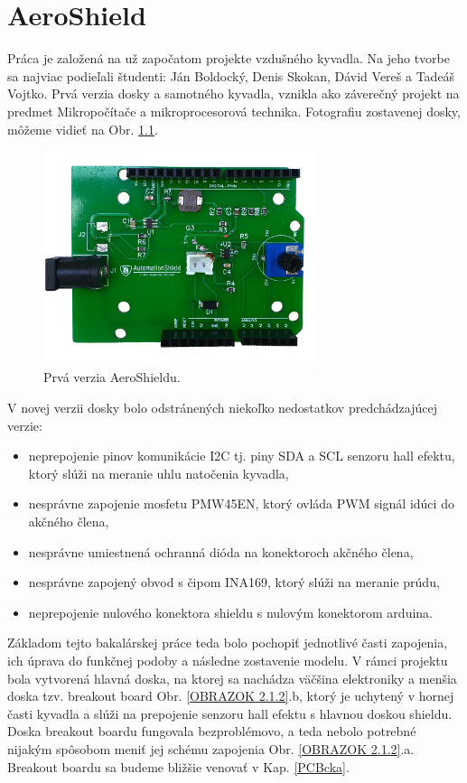 \chapter{AeroShield}

Práca je založená na už započatom projekte vzdušného kyvadla. Na jeho tvorbe sa najviac podieľali študenti: Ján Boldocký, Denis Skokan, Dávid Vereš a Tadeáš Vojtko. Prvá verzia dosky a samotného kyvadla, vznikla ako záverečný projekt na predmet Mikropočítače a mikroprocesorová technika. Fotografiu zostavenej dosky, môžeme vidieť na Obr. \ref{OBRAZOK 2.1.1}.


\begin{figure}[tbh]
	\centering
	\includegraphics[width=80mm]{obr/oldshield.png}
	\caption{Prvá verzia AeroShieldu.}\label{OBRAZOK 2.1.1}
\end{figure}


V novej verzii dosky bolo odstránených niekoľko nedostatkov predchádzajúcej verzie:

\begin{itemize}
	\item neprepojenie pinov komunikácie I2C tj. piny SDA a SCL senzoru hall efektu, ktorý slúži na meranie uhlu natočenia kyvadla,
	\item nesprávne zapojenie mosfetu PMW45EN, ktorý ovláda PWM signál idúci do akčného člena,
	\item nesprávne umiestnená ochranná dióda na konektoroch akčného člena,
	\item nesprávne zapojený obvod s čipom INA169, ktorý slúži na meranie prúdu,
	\item neprepojenie nulového konektora shieldu s nulovým konektorom arduina.
\end{itemize}

Základom tejto bakalárskej práce teda bolo pochopiť jednotlivé časti zapojenia, ich úprava do funkčnej podoby a následne zostavenie modelu. V rámci projektu bola vytvorená hlavná doska, na ktorej sa nachádza väčšina elektroniky a menšia doska tzv. breakout board Obr. \ref{OBRAZOK 2.1.2}.b, ktorý je uchytený v hornej časti kyvadla a slúži na prepojenie senzoru hall efektu s hlavnou doskou shieldu. Doska breakout boardu fungovala bezproblémovo, a teda nebolo potrebné nijakým spôsobom meniť jej schému zapojenia Obr. \ref{OBRAZOK 2.1.2}.a. Breakout boardu sa budeme bližšie venovať v Kap. \ref{PCBcka}.


